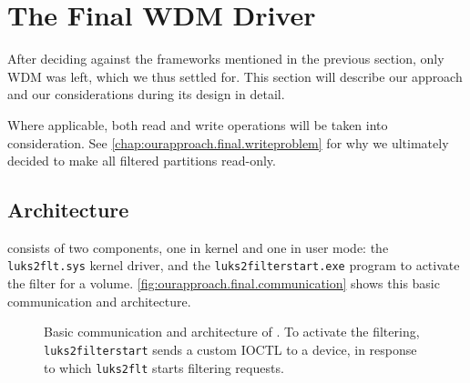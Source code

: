 \section{The Final WDM Driver}
\label{chap:ourapproach.final}
After deciding against the frameworks mentioned in the previous section, only WDM was left, which we thus settled for. This section will describe our approach and our considerations during its design in detail.

Where applicable, both read and write operations will be taken into consideration. See \autoref{chap:ourapproach.final.writeproblem} for why we ultimately decided to make all filtered partitions read-only.

\subsection{Architecture}
\label{chap:ourapproach.final.architecture}
 consists of two components, one in kernel and one in user mode: the \texttt{luks2flt.sys} kernel driver, and the \texttt{luks2filterstart.exe} program to activate the filter for a volume. \autoref{fig:ourapproach.final.communication} shows this basic communication and architecture.

\begin{figure}
	\center
	\small
	\caption[
		Basic communication and architecture of 
	]{
		Basic communication and architecture of . To activate the filtering, \texttt{luks2filterstart} sends a custom IOCTL to a device, in response to which \texttt{luks2flt} starts filtering requests.
	}
	\label{fig:ourapproach.final.communication}
\end{figure}

